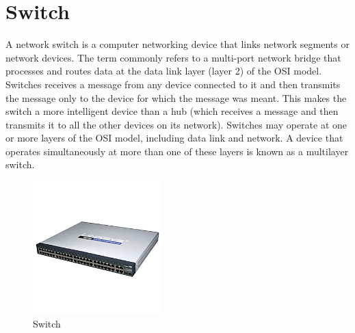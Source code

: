 \section{Switch}
A network switch is a computer networking device that links network segments or network devices. The term commonly refers to a multi-port network bridge that processes and routes data at the data link layer (layer 2) of the OSI model. Switches receives a message from any device connected to it and then transmits the message only to the device for which the message was meant. This makes the switch a more intelligent device than a hub (which receives a message and then transmits it to all the other devices on its network). 
Switches may operate at one or more layers of the OSI model, including data link and network. A device that operates simultaneously at more than one of these layers is known as a multilayer switch.
\begin{figure}[htbp]
\begin{center}
	\includegraphics[width=5cm]{./Networking/ntwhardware/switch.jpg}
\caption{Switch}
\label{default}
\end{center}
\end{figure}
